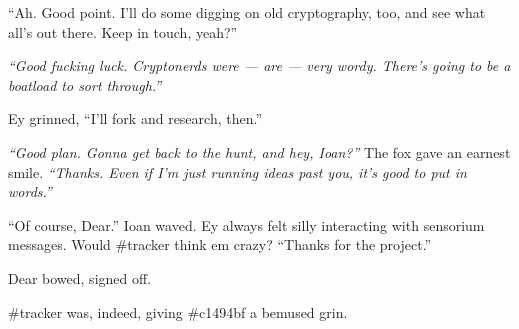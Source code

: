 ``Ah. Good point. I'll do some digging on old cryptography, too, and see what all's out there. Keep in touch, yeah?''

\emph{``Good fucking luck. Cryptonerds were --- are --- very wordy. There's going to be a boatload to sort through.''}

Ey grinned, ``I'll fork and research, then.''

\emph{``Good plan. Gonna get back to the hunt, and hey, Ioan?''} The fox gave an earnest smile. \emph{``Thanks. Even if I'm just running ideas past you, it's good to put in words.''}

``Of course, Dear.'' Ioan waved. Ey always felt silly interacting with sensorium messages. Would \#tracker think em crazy? ``Thanks for the project.''

Dear bowed, signed off.

\#tracker was, indeed, giving \#c1494bf a bemused grin.
